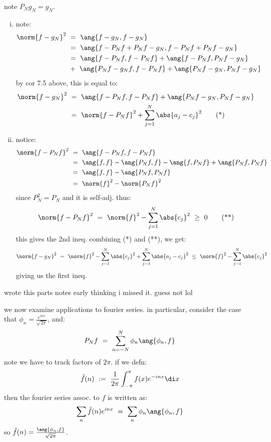 \begin{pf}
	note $P_{N}g_{N}=g_{N}$.
	\begin{enumerate}[i)]
		\item note:
			\begin{align*}
				\norm{f-g_{N}}^{2}
				& \ = \ \ang{f-g_{N},f-g_{N}} \\
				& \ = \ \ang{f-P_{N}f+P_{N}f-g_{N},f-P_{N}f+P_{N}f-g_{N}} \\
				& \ = \ \ang{f-P_{N}f,f-P_{N}f} + \ang{f-P_{N}f,P_{N}f-g_{N}} \\
				& \ + \ \ang{P_{N}f-g_{N}f,f-P_{N}f} + \ang{P_{N}f-g_{N},P_{N}f-g_{N}}
			\end{align*}
		by cor 7.5 above, this is equal to:
		\begin{align*}
			\norm{f-g_{N}}^{2} & \ = \ \ang{f-P_{N}f,f-P_{N}f}+\ang{P_{N}f-g_{N},P_{N}f-g_{N}} \\
			& \ = \ \norm{f-P_{N}f}^{2} + \sum_{j=1}^{N}\abs{a_{j}-c_{j}}^{2} \tag*{(*)}
		\end{align*}

	\item notice:
		\begin{align*}
			\norm{f-P_{N}f}^{2}
			& \ = \ \ang{f-P_{N}f,f-P_{N}f} \\
			& \ = \ \ang{f,f}-\ang{P_{N}f,f}-\ang{f,P_{N}f}+\ang{P_{N}f,P_{N}f} \\
			& \ = \ \ang{f,f}-\ang{P_{N}f,P_{N}f} \\
			& \ = \ \norm{f}^{2}-\norm{P_{N}f}^{2}
		\end{align*}
		since $P_{N}^{2}=P_{N}$ and it is self-adj. thus:
		\begin{equation*}
			\norm{f-P_{N}f}^{2} \ = \ \norm{f}^{2} - \sum_{j=1}^{N}\abs{c_{j}}^{2}
			\ \geq \ 0 \tag*{(**)}
		\end{equation*}
		this gives the 2nd ineq.
		combining (*) and (**), we get:
		\begin{equation*}
			\norm{f-g_{N}}^{2} \ = \ \norm{f}^{2}-\sum_{j=1}^{N}\abs{c_{j}}^{2}+\sum_{j=1}^{N}\abs{a_{j}-c_{j}}^{2}
			\ \leq \ \norm{f}^{2} - \sum_{j=1}^{N}\abs{c_{j}}^{2}
		\end{equation*}
		giving us the first ineq.
	\end{enumerate}
\end{pf}

wrote this parts notes early thinking i missed it. guess not lol

we now examine applications to fourier series.
in particular, consider the case that $\phi_{n}=\frac{e^{inx}}{\sqrt{2\pi}}$, and:
\begin{equation*}
	P_{N}f \ = \ \sum_{n=-N}^{N}\phi_{n}\ang{\phi_{n},f}
\end{equation*}
note we have to track factors of $2\pi$. if we defn:
\begin{equation*}
	\hat{f}(n) \ := \ \frac{1}{2\pi}\int_{-\pi}^{\pi}f(x)e^{-inx}\di x
\end{equation*}
then the fourier series assoc. to $f$ is written as:
\begin{equation*}
	\sum_{n}\hat{f}(n)e^{inx} \ = \ \sum_{n}\phi_{n}\ang{\phi_{n},f}
\end{equation*}
so $\hat{f}(n)=\frac{\ang{\phi_{n},f}}{\sqrt{2\pi}}$.

